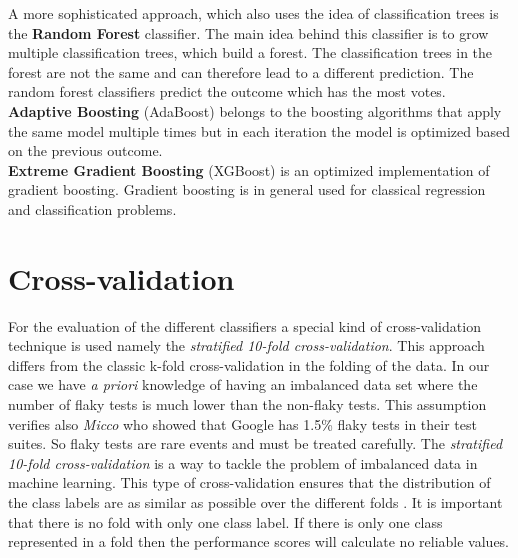 \documentclass{seal_thesis}
\begin{document}
\noindent A more sophisticated approach, which also uses the idea of classification trees is the \textbf{Random Forest} classifier. The main idea behind this classifier is to grow multiple classification trees, which build a forest. The classification trees in the forest are not the same and can therefore lead to a different prediction. The random forest classifiers predict the outcome which has the most votes. \\

\noindent \textbf{Adaptive Boosting} (AdaBoost) belongs to the boosting algorithms that apply the same model multiple times but in each iteration the model is optimized based on the previous outcome. \\

\noindent \textbf{Extreme Gradient Boosting} (XGBoost) \cite{xgboost} is an optimized implementation of gradient boosting. Gradient boosting is in general used for classical regression and classification problems.




\section{Cross-validation}
For the evaluation of the different classifiers a special kind of cross-validation technique is used namely the \textit{stratified 10-fold cross-validation}. This approach differs from the classic k-fold cross-validation in the folding of the data. In our case we have \textit{a priori} knowledge of having an imbalanced data set where the number of flaky tests is much lower than the non-flaky tests. This assumption verifies also \textit{Micco} \cite{micco17} who showed that Google has 1.5\% flaky tests in their test suites. So flaky tests are rare events and must be treated carefully. The \textit{stratified 10-fold cross-validation} is a way to tackle the problem of imbalanced data in machine learning. This type of cross-validation ensures that the distribution of the class labels are as similar as possible over the different folds \cite{qian09}. It is important that there is no fold with only one class label. If there is only one class represented in a fold then the performance scores will calculate no reliable values.
\end{document}
